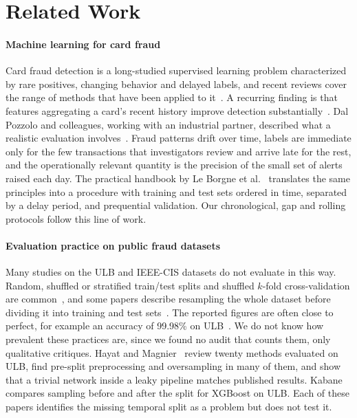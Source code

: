 \section{Related Work}
\label{sec:related}

\paragraph{Machine learning for card fraud}
Card fraud detection is a long-studied supervised learning problem characterized by rare positives, changing behavior and delayed labels, and recent reviews cover the range of methods that have been applied to it~\cite{lucas2020credit}. A recurring finding is that features aggregating a card's recent history improve detection substantially~\cite{bahnsen2016feature,jurgovsky2018sequence}. Dal Pozzolo and colleagues, working with an industrial partner, described what a realistic evaluation involves~\cite{dalpozzolo2014learned,dalpozzolo2018credit}. Fraud patterns drift over time, labels are immediate only for the few transactions that investigators review and arrive late for the rest, and the operationally relevant quantity is the precision of the small set of alerts raised each day. The practical handbook by Le Borgne et al.~\cite{leborgne2022fraud} translates the same principles into a procedure with training and test sets ordered in time, separated by a delay period, and prequential validation. Our chronological, gap and rolling protocols follow this line of work.

\paragraph{Evaluation practice on public fraud datasets}
Many studies on the ULB and IEEE-CIS datasets do not evaluate in this way. Random, shuffled or stratified train/test splits and shuffled $k$-fold cross-validation are common~\cite{esenogho2022neural,alfaiz2022enhanced,chung2023credit,mim2024soft,du2024novel,becerrasuarez2026conservative}, and some papers describe resampling the whole dataset before dividing it into training and test sets~\cite{ileberi2021performance,ahmad2023class,khalid2024enhancing}. The reported figures are often close to perfect, for example an accuracy of 99.98\% on ULB~\cite{ileberi2021performance}. We do not know how prevalent these practices are, since we found no audit that counts them, only qualitative critiques. Hayat and Magnier~\cite{hayat2025data} review twenty methods evaluated on ULB, find pre-split preprocessing and oversampling in many of them, and show that a trivial network inside a leaky pipeline matches published results. Kabane~\cite{kabane2024impact} compares sampling before and after the split for XGBoost on ULB. Each of these papers identifies the missing temporal split as a problem but does not test it.

